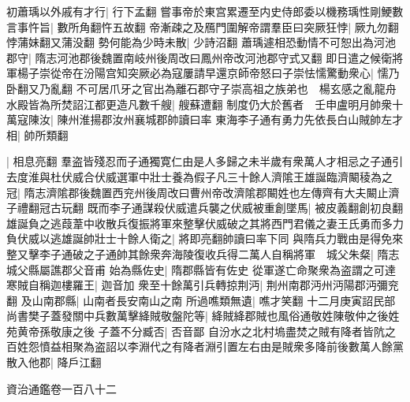 初蕭瑀以外戚有才行|{
	行下孟翻}
嘗事帝於東宫累遷至内史侍郎委以機務瑀性剛鯁數言事忤旨|{
	數所角翻忤五故翻}
帝漸疎之及鴈門圍解帝謂羣臣曰突厥狂悖|{
	厥九勿翻悖蒲妹翻又蒲没翻}
勢何能為少時未散|{
	少詩沼翻}
蕭瑀遽相恐動情不可恕出為河池郡守|{
	隋志河池郡後魏置南岐州後周改曰鳳州帝改河池郡守式又翻}
即日遣之候衛將軍楊子崇從帝在汾陽宫知突厥必為寇屢請早還京師帝怒曰子崇怯懦驚動衆心|{
	懦乃卧翻又乃亂翻}
不可居爪牙之官出為離石郡守子崇高祖之族弟也　楊玄感之亂龍舟水殿皆為所焚詔江都更造凡數千艘|{
	艘蘇遭翻}
制度仍大於舊者　壬申盧明月帥衆十萬寇陳汝|{
	陳州淮揚郡汝州襄城郡帥讀曰率}
東海李子通有勇力先依長白山賊帥左才相|{
	帥所類翻}


|{
	相息亮翻}
羣盗皆殘忍而子通獨寛仁由是人多歸之未半歲有衆萬人才相忌之子通引去度淮與杜伏威合伏威選軍中壯士養為假子凡三十餘人濟隂王雄誕臨濟闞稜為之冠|{
	隋志濟隂郡後魏置西兖州後周改曰曹州帝改濟隂郡闞姓也左傳齊有大夫闞止濟子禮翻冠古玩翻}
既而李子通謀殺伏威遣兵襲之伏威被重創墜馬|{
	被皮義翻創初良翻}
雄誕負之逃葭葦中收散兵復振將軍來整擊伏威破之其將西門君儀之妻王氏勇而多力負伏威以逃雄誕帥壯士十餘人衛之|{
	將即亮翻帥讀曰率下同}
與隋兵力戰由是得免來整又擊李子通破之子通帥其餘衆奔海陵復收兵得二萬人自稱將軍　城父朱粲|{
	隋志城父縣屬譙郡父音甫}
始為縣佐史|{
	隋郡縣皆有佐史}
從軍遂亡命聚衆為盗謂之可達寒賊自稱迦樓羅王|{
	迦音加}
衆至十餘萬引兵轉掠荆沔|{
	荆州南郡沔州沔陽郡沔彌兖翻}
及山南郡縣|{
	山南者長安南山之南}
所過噍類無遺|{
	噍才笑翻}
十二月庚寅詔民部尚書樊子蓋發關中兵數萬擊絳賊敬盤陀等|{
	絳賊絳郡賊也風俗通敬姓陳敬仲之後姓苑黄帝孫敬康之後}
子蓋不分臧否|{
	否音鄙}
自汾水之北村塢盡焚之賊有降者皆阬之百姓怨憤益相聚為盗詔以李淵代之有降者淵引置左右由是賊衆多降前後數萬人餘黨散入他郡|{
	降戶江翻}


資治通鑑卷一百八十二
